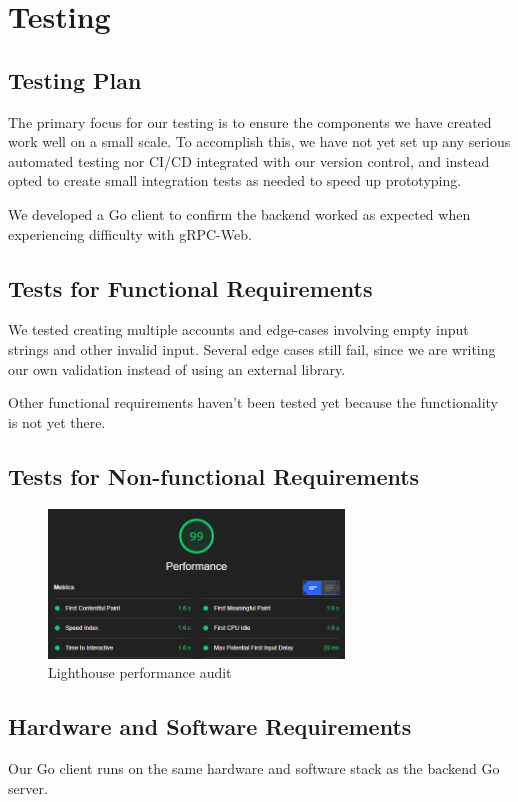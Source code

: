 
\section{Testing}\label{sec:testing}
    \subsection{Testing Plan}
        The primary focus for our testing is to ensure the components we have created work well on a small scale. To accomplish this, we have not yet set up any serious automated testing nor CI/CD integrated with our version control, and instead opted to create small integration tests as needed to speed up prototyping.

        We developed a Go client to confirm the backend worked as expected when experiencing difficulty with gRPC-Web. 

    \subsection{Tests for Functional Requirements}
        We tested creating multiple accounts and edge-cases involving empty input strings and other invalid input. Several edge cases still fail, since we are writing our own validation instead of using an external library.

        Other functional requirements haven't been tested yet because the functionality is not yet there.

    \subsection{Tests for Non-functional Requirements}
        \begin{figure}[h!]
            \centering
            
            \caption{Lighthouse performance audit}
            \includegraphics[width=0.7\textwidth]{images/lighthouse.png}
        \end{figure}
    
    \subsection{Hardware and Software Requirements}
        Our Go client runs on the same hardware and software stack as the backend Go server.

